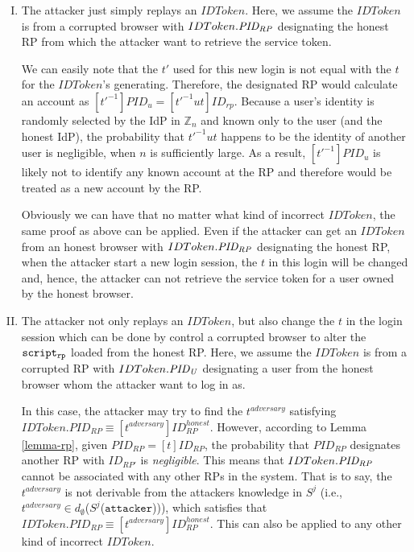   \begin{enumerate}[I.]
    \item The attacker just simply replays an $IDToken$. Here, 
      we assume the $IDToken$ is from a corrupted browser with 
      $IDToken.\mathit{PID_{RP}}$ designating the honest RP from 
      which the attacker want to retrieve the service token.

      We can easily note that the $t'$ used for this new login 
      is not equal with the $t$ for the $IDToken$'s generating.
      Therefore, the designated RP would calculate an 
      account as $[t'^{-1}]PID_u = [t'^{-1}ut]ID_{rp}$.
      Because a user's identity is randomly selected by the IdP 
      in $\mathbb{Z}_n$ and known only to the user (and the honest 
      IdP), the probability that $t'^{-1}ut$ happens to be the 
      identity of another user is negligible, when $n$ is 
      sufficiently large. As a result, $[t'^{-1}]PID_u$ is likely 
      not to identify any known account at the RP and therefore 
      would be treated as a new account by the RP.

      Obviously we can have that no matter what kind of 
      incorrect $IDToken$, the same proof as above can be applied.
      Even if the attacker can get an $IDToken$ from an honest 
      browser with $IDToken.\mathit{PID_{RP}}$ designating the 
      honest RP, when the attacker start a new login session, 
      the $t$ in this login will be changed and, hence, the 
      attacker can not retrieve the service token for a user 
      owned by the honest browser.

    \item The attacker not only replays an $IDToken$, but also 
      change the $t$ in the login session which can be done by 
      control a corrupted browser to alter the $\mathtt{script_{rp}}$ 
      loaded from the honest RP. Here, 
      we assume the $IDToken$ is from a corrupted RP with 
      $IDToken.\mathit{PID_{U}}$ designating a user from the honest 
      browser whom the attacker want to log in as.

      In this case, the attacker may try to find the 
      $t^{adversary}$ satisfying $IDToken.PID_{RP} \equiv 
      [t^{adversary}]ID_{RP}^{honest}$.
      However, according to Lemma \ref{lemma-rp}, given 
      $PID_{RP} = [t]ID_{RP}$, the probability that $PID_{RP}$ 
      designates another RP with $ID_{RP'}$ is \emph{negligible}. 
      This means that $IDToken.\mathit{PID_{RP}}$ cannot be 
      associated with any other RPs in the system. 
      That is to say, the $t^{adversary}$ is not derivable from 
      the attackers knowledge in $S^j$ (i.e., $t^{adversary} \in d_{\emptyset}$($S^j$($\mathtt{attacker}$))), 
      which satisfies that $IDToken.PID_{RP} \equiv [t^{adversary}]ID_{RP}^{honest}$.
      This can also be applied to any other kind of incorrect $IDToken$.
  \end{enumerate}

